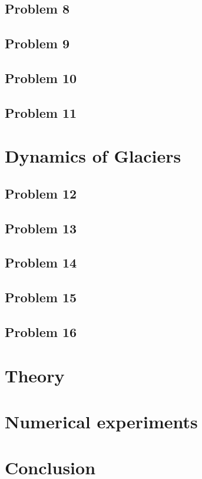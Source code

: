 \documentclass[11pt,a4paper,twoside,norsk]{article}
\begin{document}
\subsection*{Problem 8}


\subsection*{Problem 9}
 

\subsection*{Problem 10}


\subsection*{Problem 11}


\section{Dynamics of Glaciers}

\subsection*{Problem 12}


\subsection*{Problem 13}


\subsection*{Problem 14}


\subsection*{Problem 15}


\subsection*{Problem 16}


\section{Theory}
\label{sec:theory}


\section{Numerical experiments}
\label{sec:numexp}


\section{Conclusion}
\label{sec:conclusion}



 
\end{document}
